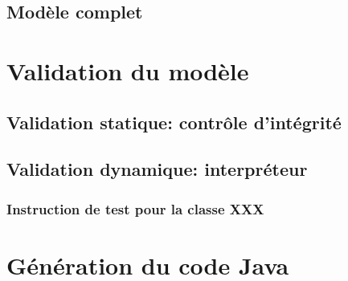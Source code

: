 \documentclass{article}
\begin{document}
\subsection{Modèle complet}

\section{Validation du modèle}
\subsection{Validation statique: contrôle d'intégrité}
\subsection{Validation dynamique: interpréteur}
\subsubsection{Instruction de test pour la classe XXX}

\section{Génération du code Java}
\end{document}
